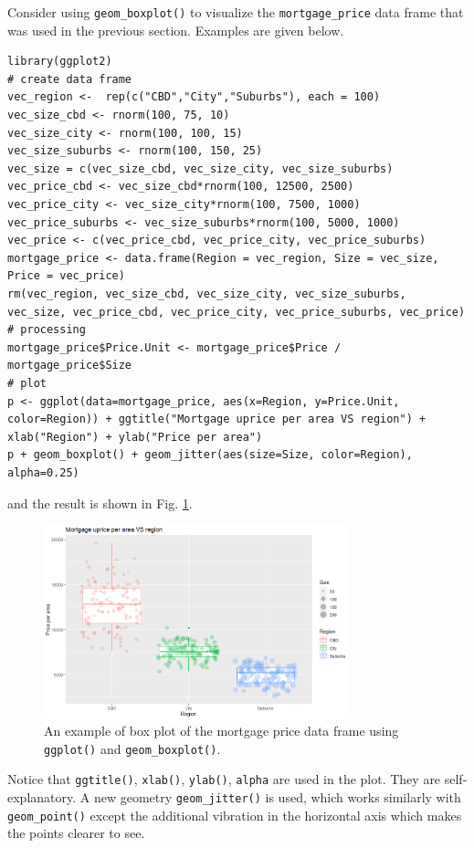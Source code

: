 Consider using \verb|geom_boxplot()| to visualize the \verb|mortgage_price| data frame that was used in the previous section. Examples are given below.
\begin{lstlisting}
library(ggplot2)
# create data frame
vec_region <-  rep(c("CBD","City","Suburbs"), each = 100)
vec_size_cbd <- rnorm(100, 75, 10)
vec_size_city <- rnorm(100, 100, 15)
vec_size_suburbs <- rnorm(100, 150, 25)
vec_size = c(vec_size_cbd, vec_size_city, vec_size_suburbs)
vec_price_cbd <- vec_size_cbd*rnorm(100, 12500, 2500)
vec_price_city <- vec_size_city*rnorm(100, 7500, 1000)
vec_price_suburbs <- vec_size_suburbs*rnorm(100, 5000, 1000)
vec_price <- c(vec_price_cbd, vec_price_city, vec_price_suburbs)
mortgage_price <- data.frame(Region = vec_region, Size = vec_size, Price = vec_price)
rm(vec_region, vec_size_cbd, vec_size_city, vec_size_suburbs, vec_size, vec_price_cbd, vec_price_city, vec_price_suburbs, vec_price)
# processing
mortgage_price$Price.Unit <- mortgage_price$Price / mortgage_price$Size
# plot
p <- ggplot(data=mortgage_price, aes(x=Region, y=Price.Unit, color=Region)) + ggtitle("Mortgage uprice per area VS region") + xlab("Region") + ylab("Price per area")
p + geom_boxplot() + geom_jitter(aes(size=Size, color=Region), alpha=0.25)
\end{lstlisting}
and the result is shown in Fig. \ref{ch:r1:fig:mortgage_barplot_demo}.
\begin{figure}
	\centering
	\includegraphics[width=250pt]{chapters/ch-r/figures/mortgage_barplot_demo.png}
	\caption{An example of box plot of the mortgage price data frame using \texttt{ggplot()} and \texttt{geom_boxplot()}.} \label{ch:r1:fig:mortgage_barplot_demo}
\end{figure}
Notice that \verb|ggtitle()|, \verb|xlab()|, \verb|ylab()|, \verb|alpha| are used in the plot. They are self-explanatory. A new geometry \verb|geom_jitter()| is used, which works similarly with \verb|geom_point()| except the additional vibration in the horizontal axis which makes the points clearer to see.

